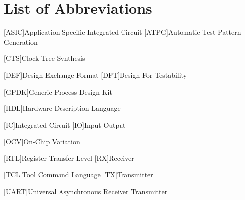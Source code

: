 \section*{List of Abbreviations}
\begin{acronym}
	[ASIC]{Application Specific Integrated Circuit}
	[ATPG]{Automatic Test Pattern Generation}
	
	[CTS]{Clock Tree Synthesis}
	
	
	[DEF]{Design Exchange Format}
	[DFT]{Design For Testability}
		
	[GPDK]{Generic Process Design Kit}
		
	[HDL]{Hardware Description Language}
	
	[IC]{Integrated Circuit}
	[IO]{Input Output}
	
	
	[OCV]{On-Chip Variation}
		
	[RTL]{Register-Transfer Level}
	[RX]{Receiver}
		
	[TCL]{Tool Command Language}
	[TX]{Transmitter}
	
	[UART]{Universal Asynchronous Receiver Transmitter}
	
\end{acronym}


